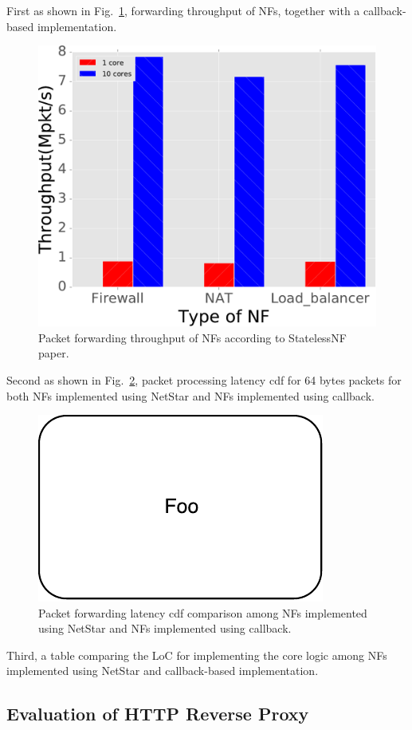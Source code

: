 First as shown in Fig.~\ref{snf1}, forwarding throughput of NFs, together with a callback-based implementation.

\begin{figure}[!t]
  \centering
  \includegraphics[width=0.5\columnwidth]{figure/Throughput.pdf}
  \caption{Packet forwarding throughput of NFs according to StatelessNF paper.}
  \label{snf1}
\end{figure}

Second as shown in Fig.~\ref{snf2}, packet processing latency cdf for 64 bytes packets for both NFs implemented using NetStar and NFs implemented using callback.

\begin{figure}[!t]
  \centering
  \includegraphics[width=0.5\columnwidth]{figure/foo.pdf}
  \caption{Packet forwarding latency cdf comparison among NFs implemented using NetStar and NFs implemented using callback.}
  \label{snf2}
\end{figure}

Third, a table comparing the LoC for implementing the core logic among NFs implemented using NetStar and callback-based implementation.

\subsection{Evaluation of HTTP Reverse Proxy}

